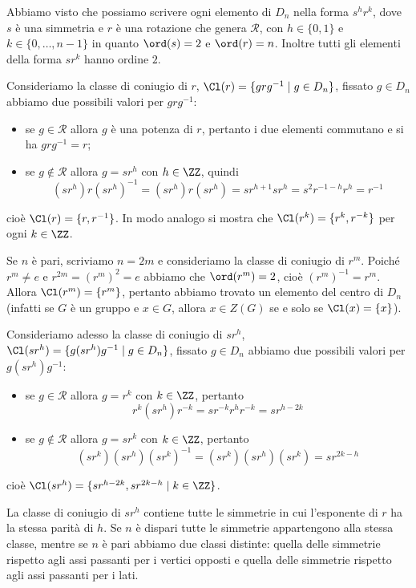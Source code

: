 \documentclass[11pt]{scrartcl}
\begin{document}
Abbiamo visto che possiamo scrivere ogni elemento di $D_n$ nella forma
 $s^hr^k$, dove $s$ è una simmetria e $r$ è una rotazione che genera 
 $\mathcal{R}$, con $h \in \{0, 1\}$ e $k \in \{0, \ldots, n - 1\}$
in quanto $\ord(s)= 2$ e $\ord(r) = n$. Inoltre tutti gli elementi della
forma $sr^k$ hanno ordine $2$.

Consideriamo la classe di coniugio di $r$, $\Cl(r) = \{grg^{-1}\mid g \in D_n\}$,
fissato $g \in D_n$ abbiamo due possibili valori per $grg^{-1}$:
\begin{itemize}
    \item se $g \in \mathcal{R}$ allora $g$ è una potenza di $r$, pertanto i
    due elementi commutano e si ha $grg^{-1} = r$;
    \item se $g\notin\mathcal{R}$ allora $g = sr^h$ con $h \in \ZZ$, quindi
    \[
        (sr^h)r(sr^h)^{-1} = (sr^h)r(sr^h) = sr^{h + 1}sr^h = s^2r^{-1-h}r^h = r^{-1}
    \]
\end{itemize}
cioè $\Cl(r) = \{r, r^{-1}\}$. In modo analogo si mostra che $\Cl(r^k) = \{r^k, r^{-k}\}$
per ogni $k \in \ZZ$.

\begin{remark}
    Se $n$ è pari, scriviamo $n = 2m$ e consideriamo la classe di coniugio
    di $r^m$. Poiché $r^m \neq e$ e $r^{2m} = (r^m)^2 = e$ abbiamo che
    $\ord(r^m) = 2$, cioè $(r^m)^{-1} = r^m$. Allora $\Cl(r^m) = \{r^m\}$,
    pertanto abbiamo trovato un elemento del centro di $D_n$ (infatti se $G$
    è un gruppo e $x \in G$, allora $x \in Z(G)$ se e solo se $\Cl(x) = \{x\}$).
\end{remark}

Consideriamo adesso la classe di coniugio di $sr^h$, $\Cl(sr^h) = 
\{g(sr^h)g^{-1}\mid g\in D_n\}$, fissato $g \in D_n$ abbiamo due possibili
valori per $g(sr^h)g^{-1}$:
\begin{itemize}
    \item se $g \in \mathcal{R}$ allora $g = r^k$ con $k \in \ZZ$, pertanto
    \[
        r^k(sr^h)r^{-k} = sr^{-k}r^h r^{-k} = sr^{h - 2k}
    \]
    \item se $g \notin \mathcal{R}$ allora $g = sr^k$ con $k \in \ZZ$, pertanto
    \[
        (sr^k)(sr^h)(sr^k)^{-1} = (sr^k)(sr^h)(sr^k) = sr^{2k - h}
    \]
\end{itemize}
cioè $\Cl(sr^h) = \{sr^{h - 2k}, sr^{2k - h}\mid k \in \ZZ\}$. 

\begin{remark}
    La classe di coniugio di $sr^h$ contiene tutte le simmetrie in cui 
    l'esponente di $r$ ha la stessa parità di $h$. Se $n$ è 
    dispari tutte le simmetrie appartengono alla stessa classe,
    mentre se $n$ è pari abbiamo due classi distinte: quella 
    delle simmetrie rispetto agli assi passanti per i vertici opposti e quella 
    delle simmetrie rispetto agli assi passanti per i lati.
\end{remark}
\end{document}
